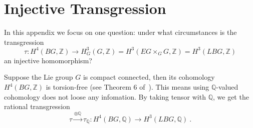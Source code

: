 \documentclass[a4paper,11pt]{article}
\newcommand{\be}{\begin{equation}}
\newcommand{\ee}{\end{equation}}
\def\bbQ{\mathbb{Q}}
\def\bbZ{\mathbb{Z}}
\begin{document}
\section{Injective Transgression}\label{app:injectivetransgression}
In this appendix we focus on one question: under what circumstances is the transgression
\be \tau: H^4(BG,\bbZ) \to H^3_G(G,\bbZ) = H^3(EG\times_G G,\bbZ) = H^3(LBG,\bbZ)\ee
an injective homomorphism?

Suppose the Lie group $G$ is compact connected, then its cohomology $H^4(BG,\bbZ)$ is torsion-free (see Theorem 6 of~\cite{Henriques:2016ipo}). This means using $\bbQ$-valued cohomology does not loose any infomation. By taking tensor with $\bbQ$, we get the rational transgression
\be  \tau \stackrel{\otimes \bbQ}{\longrightarrow} \tau_\bbQ : H^4(BG,\bbQ) \to H^3(LBG,\bbQ) \ . \ee
\end{document}
